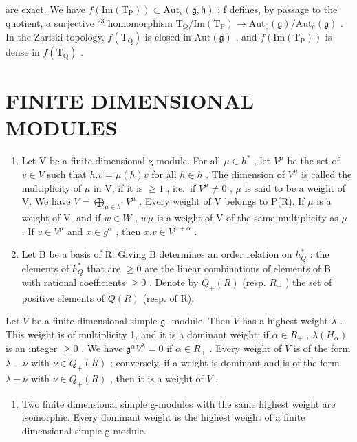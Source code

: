 are exact. We have \(f(\mathrm{Im}(\mathrm{T}_{\mathrm{P}})) \subset \mathrm{Aut}_{e}(\mathfrak{g}, \mathfrak{h})\) ; f defines, by passage to the quotient, a surjective \(^{23}\) homomorphism \(\mathrm{T}_{\mathrm{Q}}/\mathrm{Im}(\mathrm{T}_{\mathrm{P}}) \to \mathrm{Aut}_{0}(\mathfrak{g})/\mathrm{Aut}_{e}(\mathfrak{g})\) . In the Zariski topology, \(f(\mathrm{T}_{\mathrm{Q}})\) is closed in \(\mathrm{Aut}(\mathfrak{g})\) , and \(f(\mathrm{Im}(\mathrm{T}_{\mathrm{P}}))\) is dense in \(f(\mathrm{T}_{\mathrm{Q}})\) .

\section*{FINITE DIMENSIONAL MODULES}

\begin{enumerate}
\def\labelenumi{\arabic{enumi})}
\setcounter{enumi}{18}
\item
  Let V be a finite dimensional g-module. For all \(\mu\in h^{*}\) , let \(V^{\mu}\) be the set of \(v\in V\) such that \(h.v=\mu(h)v\) for all \(h\in h\) . The dimension of \(V^{\mu}\) is called the multiplicity of \(\mu\) in V; if it is \(\geq1\) , i.e.~if \(V^{\mu}\neq0\) , \(\mu\) is said to be a weight of V. We have \(V=\bigoplus_{\mu\in h^{*}}V^{\mu}\) . Every weight of V belongs to P(R). If \(\mu\) is a weight of V, and if \(w\in W\) , \(w\mu\) is a weight of V of the same multiplicity as \(\mu\) . If \(v\in V^{\mu}\) and \(x\in g^{\alpha}\) , then \(x.v\in V^{\mu+\alpha}\) .
\item
  Let B be a basis of R. Giving B determines an order relation on \(h_{Q}^{*}\) : the elements of \(h_{Q}^{*}\) that are \(\geq 0\) are the linear combinations of elements of B with rational coefficients \(\geq 0\) . Denote by \(Q_{+}(R)\) (resp. \(R_{+}\) ) the set of positive elements of \(Q(R)\) (resp. of R).
\end{enumerate}

Let \(V\) be a finite dimensional simple \(\mathfrak{g}\) -module. Then \(V\) has a highest weight \(\lambda\) . This weight is of multiplicity 1, and it is a dominant weight: if \(\alpha \in R_{+}\) , \(\lambda(H_{\alpha})\) is an integer \(\geq 0\) . We have \(\mathfrak{g}^{\alpha}V^{\lambda} = 0\) if \(\alpha \in R_{+}\) . Every weight of \(V\) is of the form \(\lambda - \nu\) with \(\nu \in Q_{+}(R)\) ; conversely, if a weight is dominant and is of the form \(\lambda - \nu\) with \(\nu \in Q_{+}(R)\) , then it is a weight of \(V\) .

\begin{enumerate}
\def\labelenumi{\arabic{enumi})}
\setcounter{enumi}{20}
\tightlist
\item
  Two finite dimensional simple g-modules with the same highest weight are isomorphic. Every dominant weight is the highest weight of a finite dimensional simple g-module.
\end{enumerate}

